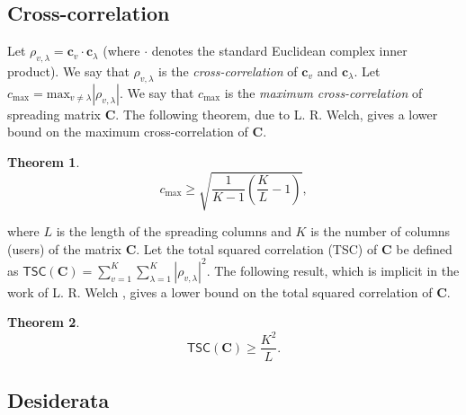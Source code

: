 \documentclass[journal,comsoc]{IEEEtran}
\newtheorem{theorem}{Theorem}[section]
\begin{document}
 \subsection{Cross-correlation}
 Let $\rho_{v,\lambda} = \mathbf{c}_v \cdot \mathbf{c}_{\lambda}$ (where $\cdot$ denotes the standard Euclidean complex inner product). We say that $\rho_{v,\lambda}$ is the \emph{cross-correlation} of $\mathbf{c}_v$ and $\mathbf{c}_{\lambda}.$ \iffalse The cross-correlation is an important measure for determining the extent to which sequences in a code matrix interfere with one another.
 \fi
 Let $c_{\text{max}} = \text{max}_{v \neq \lambda}|\rho_{v,\lambda}|.$ We say that $c_{\text{max}}$ is the \emph{maximum cross-correlation} of spreading matrix $\mathbf{C}.$ The following theorem, due to L. R. Welch, gives a lower bound on the maximum cross-correlation of $\mathbf{C}.$
 \begin{theorem} \cite[Proof of Inner Products Theorem, case $k = 1$]{Welch1974} 
 \[c_{\text{max}} \geq \sqrt{\frac{1}{K-1}\left(\frac{K}{L}-1\right)},\]
 \end{theorem}
\noindent where $L$ is the length of the spreading columns and $K$ is the number of columns (users) of the matrix $\mathbf{C}$.
Let the total squared correlation (TSC) of $\mathbf{C}$ be defined as $\textsf{TSC}(\mathbf{C}) = \sum_{v = 1}^K\sum_{\lambda = 1}^K |\rho_{v,\lambda}|^2$. The following result, which is implicit in the work of L. R. Welch \cite{Welch1974}, gives a lower bound on the total squared correlation of $\mathbf{C}.$
\begin{theorem} \cite[Proof of Inner Products Theorem]{Welch1974} 
\[\textsf{TSC}(\mathbf{C}) \geq \frac{K^2}{L}.\]
\end{theorem}
\vspace{-0.9cm}  \fi
\subsection{Desiderata}
\iffalse We now list some properties which are useful for a spreading matrix $\mathbf{C}$ to possess (and which the spreading matrices we construct in this paper do, at least to some extent, possess). \fi
\end{document}
